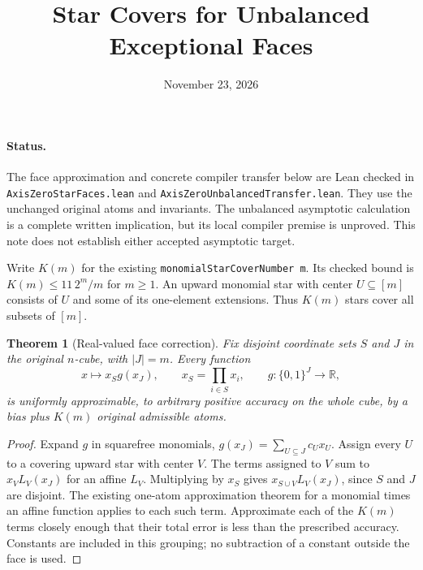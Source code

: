 \documentclass[11pt]{article}
\title{Star Covers for Unbalanced Exceptional Faces}
\author{}
\date{November 23, 2026}
\newtheorem{theorem}{Theorem}
\begin{document}
\maketitle

\paragraph{Status.}
The face approximation and concrete compiler transfer below are Lean
checked in \texttt{AxisZeroStarFaces.lean} and
\texttt{AxisZeroUnbalancedTransfer.lean}. They use the unchanged original
atoms and invariants. The unbalanced asymptotic calculation is a complete
written implication, but its local compiler premise is unproved. This
note does not establish either accepted asymptotic target.

Write $K(m)$ for the existing \texttt{monomialStarCoverNumber m}. Its
checked bound is $K(m)\leq 11\,2^m/m$ for $m\geq1$.
An upward monomial star with center $U\subseteq[m]$ consists of $U$ and
some of its one-element extensions. Thus $K(m)$ stars cover all subsets
of $[m]$.

\begin{theorem}[Real-valued face correction]
Fix disjoint coordinate sets $S$ and $J$ in the original $n$-cube, with
$|J|=m$. Every function
\[
 x\longmapsto x_S g(x_J),\qquad x_S=\prod_{i\in S}x_i,
 \qquad g:\{0,1\}^J\longrightarrow\mathbb R,
\]
is uniformly approximable, to arbitrary positive accuracy on the whole
cube, by a bias plus $K(m)$ original admissible atoms.
\end{theorem}
\begin{proof}
Expand $g$ in squarefree monomials,
$g(x_J)=\sum_{U\subseteq J}c_Ux_U$. Assign every $U$ to a covering
upward star with center $V$. The terms assigned to $V$ sum to
$x_V L_V(x_J)$ for an affine $L_V$. Multiplying by $x_S$ gives
$x_{S\cup V}L_V(x_J)$, since $S$ and $J$ are disjoint. The existing
one-atom approximation theorem for a monomial times an affine function
applies to each such term. Approximate each of the $K(m)$ terms closely
enough that their total error is less than the prescribed accuracy.
Constants are included in this grouping; no subtraction of a constant
outside the face is used.
\end{proof}
\end{document}
